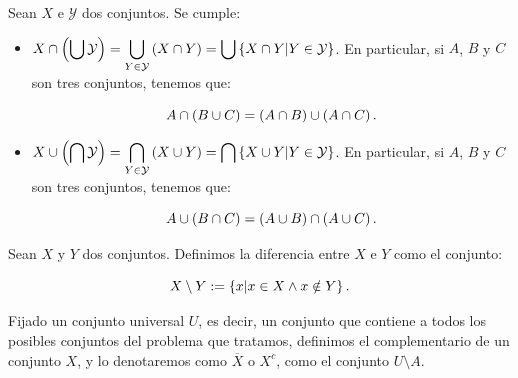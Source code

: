 \begin{theorem}
\rm Sean $X$ e $\mathcal{Y}$ dos conjuntos. Se cumple:

\begin{itemize}
    \item[1.] $\displaystyle X\cap\left(\bigcup{\mathcal{Y}}\right)=\bigcup_{Y\in\mathcal{Y}}{\left(X\cap Y\right)}=\bigcup{\left\{X\cap Y\middle|Y\in\mathcal{Y}\right\}}$. En particular, si $A$, $B$ y $C$ son tres conjuntos, tenemos que:
    
    \begin{equation}
        A\cap\left(B\cup C\right)=\left(A\cap B\right)\cup\left(A\cap C\right).
    \end{equation}
    \item[2.] $\displaystyle X\cup\left(\bigcap{\mathcal{Y}}\right)=\bigcap_{Y\in\mathcal{Y}}{\left(X\cup Y\right)}=\bigcap{\left\{X\cup Y\middle|Y\in\mathcal{Y}\right\}}$. En particular, si $A$, $B$ y $C$ son tres conjuntos, tenemos que:

    \begin{equation}
        A\cup\left(B\cap C\right)=\left(A\cup B\right)\cap\left(A\cup C\right).
    \end{equation}
\end{itemize}
\end{theorem}

\begin{definition}
  \rm Sean $X$ y $Y$ dos conjuntos. Definimos la diferencia entre $X$ e $Y$ como el conjunto:

\begin{equation}
    X\setminus Y:=\left\{x\middle|x\in X\land x\notin Y\right\}.
\end{equation}
\end{definition}

\begin{definition}
\rm Fijado un conjunto universal $U$, es decir, un conjunto que contiene a todos los posibles conjuntos del problema que tratamos, definimos el complementario de un conjunto $X$, y lo denotaremos como $\overline{X}$ o $X^c$, como el conjunto $U\setminus A$.
\end{definition}

